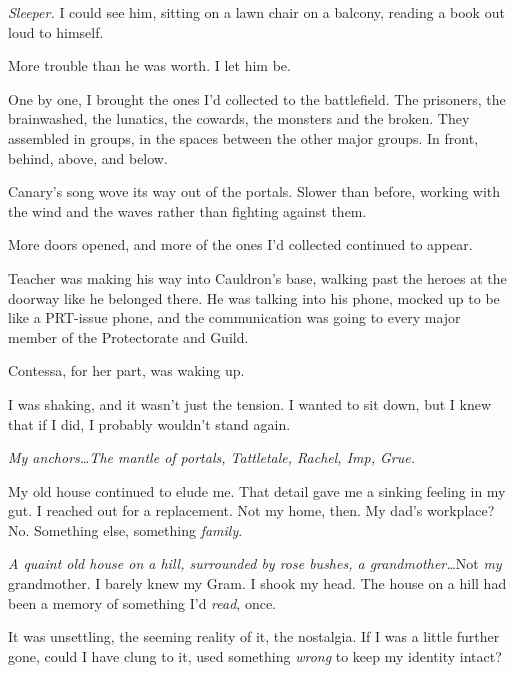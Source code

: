 \emph{Sleeper. } I could see him, sitting on a lawn chair on a balcony, reading a book out loud to himself.



More trouble than he was worth.  I let him be.



One by one, I brought the ones I'd collected to the battlefield.  The prisoners, the brainwashed, the lunatics, the cowards, the monsters and the broken.  They assembled in groups, in the spaces between the other major groups.  In front, behind, above, and below.



Canary's song wove its way out of the portals.  Slower than before, working with the wind and the waves rather than fighting against them.



More doors opened, and more of the ones I'd collected continued to appear.



Teacher was making his way into Cauldron's base, walking past the heroes at the doorway like he belonged there.  He was talking into his phone, mocked up to be like a PRT-issue phone, and the communication was going to every major member of the Protectorate and Guild.



Contessa, for her part, was waking up.



I was shaking, and it wasn't just the tension.  I wanted to sit down, but I knew that if I did, I probably wouldn't stand again.



\emph{My anchors\ldots  The mantle of portals, Tattletale, Rachel, Imp, Grue.}



My old house continued to elude me.  That detail gave me a sinking feeling in my gut.  I reached out for a replacement.  Not my home, then.  My dad's workplace?  No.  Something else, something \emph{family}.



\emph{A quaint old house on a hill, surrounded by rose bushes, a grandmother\ldots  }Not \emph{my} grandmother.  I barely knew my Gram.  I shook my head.  The house on a hill had been a memory of something I'd \emph{read}, once.



It was unsettling, the seeming reality of it, the nostalgia.  If I was a little further gone, could I have clung to it, used something \emph{wrong} to keep my identity intact?



